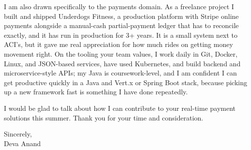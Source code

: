 \documentclass[letterpaper,11pt]{article}
\begin{document}
I am also drawn specifically to the payments domain. As a freelance project I built and shipped Underdogs Fitness, a production platform with Stripe online payments alongside a manual-cash partial-payment ledger that has to reconcile exactly, and it has run in production for 3+ years. It is a small system next to ACI's, but it gave me real appreciation for how much rides on getting money movement right. On the tooling your team values, I work daily in Git, Docker, Linux, and JSON-based services, have used Kubernetes, and build backend and microservice-style APIs; my Java is coursework-level, and I am confident I can get productive quickly in a Java and Vert.x or Spring Boot stack, because picking up a new framework fast is something I have done repeatedly.

I would be glad to talk about how I can contribute to your real-time payment solutions this summer. Thank you for your time and consideration.

\vspace{4pt}

\noindent Sincerely, \\
Deva Anand
\end{document}
